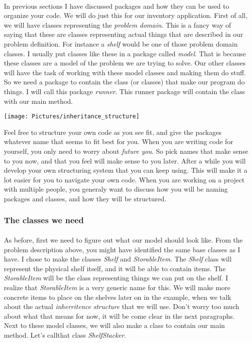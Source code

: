 \documentclass[11pt,fleqn]{book} %
\begin{document}
\paragraph{} In previous sections I have discussed packages and how they can be used to organize your code.
We will do just this for our inventory application. First of all, we will have classes representing the \emph{problem domain}. This is a fancy way of saying that these are classes representing actual things that are described in our problem definition. For instance a \emph{shelf} would be one of those problem domain classes. I usually put classes like these in a package called \emph{model}. That is because these classes are a model of the problem we are trying to solve.
Our other classes will have the task of working with these model classes and making them do stuff. So we need a package to contain the class (or classes) that make our program do things.
I will call this package \emph{runner}. This runner package will contain the class with our main method.

\texttt{[image: Pictures/inheritance\_structure]}

\begin{remark}
	Feel free to structure your own code as you see fit, and give the packages whatever name that seems to fit best for you. When you are writing code for yourself, you only need to 		worry about \emph{future you}. So pick names that make sense to you now, and that you feel will make sense to you later. After a while you will develop your own structuring system 		that you can keep using. This will make it a lot easier for you to navigate your own code. When you are working on a project with multiple people, you generaly want to discuss how 		you will be naming packages and classes, and how they will be structured.
\end{remark}

\subsubsection{The classes we need}
\paragraph{} As before, first we need to figure out what our model should look like. From the problem description above, you might have identified the same base classes as I have.
I chose to make the classes \emph{Shelf} and \emph{StorableItem}. The \emph{Shelf} class will represent the physical shelf itself, and it will be able to contain items. The \emph{StorableItem} will be the class representing things we can put on the shelf. I realize that \emph{StorableItem} is a very generic name for this. We will make more concrete items to place on the shelves later on in the example, when we talk about the actual \emph{inherritence structure} that we will use. Don't worry too much about what that means for now, it will be come clear in the next paragraphs. Next to these model classes, we will also make a class to contain our main method. Let's callthat class \emph{ShelfStacker}.
\end{document}
